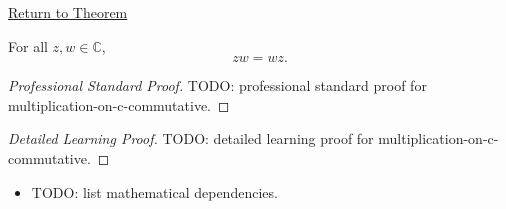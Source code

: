 \newpage
{}
\label{prf:multiplication-on-c-commutative}

\begin{remark*}[Return]
\hyperref[thm:multiplication-on-c-commutative]{Return to Theorem}
\end{remark*}

\begin{theorem*}
For all \(z,w\in\mathbb{C}\),
\[
zw=wz.
\]
\end{theorem*}

\begin{proof}[Professional Standard Proof]
\LRAProofBodyStart
TODO: professional standard proof for multiplication-on-c-commutative.
\end{proof}

\begin{proof}[Detailed Learning Proof]
\LRAProofBodyStart
TODO: detailed learning proof for multiplication-on-c-commutative.
\end{proof}

\begin{remark*}
\end{remark*}

\begin{dependencies}
\begin{itemize}
  \item TODO: list mathematical dependencies.
\end{itemize}
\end{dependencies}

\clearpage
